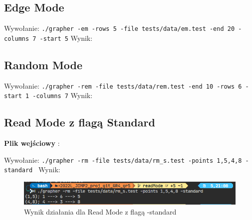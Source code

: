\documentclass[10pt, a4paper]{report}
\begin{document}
    \subsection{Edge Mode}
    Wywołanie:
    \newline\newline \texttt{./grapher -em -rows 5 -file tests/data/em.test -end 20 -columns 7 -start 5}
    \newline\newline Wynik:    
    

    \subsection{Random Mode}
    Wywołanie:
    \newline\newline \texttt{./grapher -rem -file tests/data/rem.test -end 10 -rows 6 -start 1 -columns 7}
    \newline\newline Wynik:
    

    \subsection{Read Mode z flagą Standard}
    \textbf{Plik wejściowy} :
    
    Wywołanie:
    \newline\newline \texttt{./grapher -rm -file tests/data/rm\_s.test -points 1,5,4,8 -standard }
    \newline\newline Wynik:
    \begin{figure}[ht]
        \begin{center}
            \includegraphics[scale=0.8]{rm_s.png}
            \caption {Wynik działania dla Read Mode z flagą -standard}
        \end{center}
    \end{figure}
    
\end{document}
